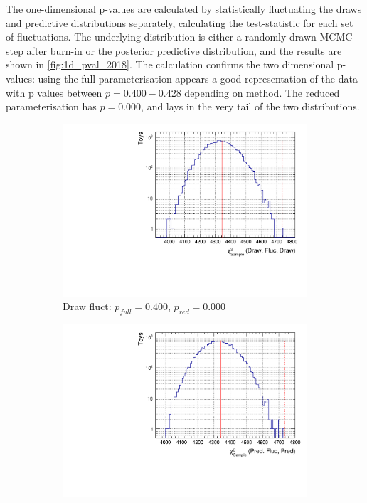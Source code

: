 The one-dimensional p-values are calculated by statistically fluctuating the draws and predictive distributions separately, calculating the test-statistic for each set of fluctuations. The underlying distribution is either a randomly drawn MCMC step after burn-in or the posterior predictive distribution, and the results are shown in \autoref{fig:1d_pval_2018}. The calculation confirms the two dimensional p-values: using the full parameterisation appears a good representation of the data with p values between $p=0.400-0.428$ depending on method. The reduced parameterisation has $p=0.000$, and lays in the very tail of the two distributions.
\begin{figure}[h]
	\centering
	\begin{subfigure}[t]{0.49\textwidth}
		\includegraphics[width=\textwidth, trim={0mm 0mm 0mm 0mm}, clip,page=1]{figures/mach3/2018/data/fullcov_pval_drawflucdraw}
		\caption{Draw fluct: $p_{full}=0.400$, $p_{red}=0.000$}
	\end{subfigure}
	\begin{subfigure}[t]{0.49\textwidth}
		\includegraphics[width=\textwidth, trim={0mm 0mm 0mm 0mm}, clip,page=1]{figures/mach3/2018/data/fullcov_pval_predflucpred}

\end{subfigure}
\end{figure}
